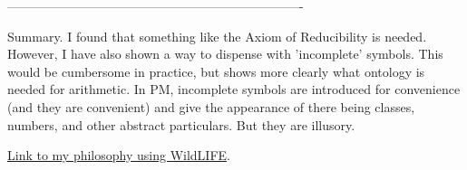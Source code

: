 \documentclass[12pt]{article}
\begin{document}
----------------------------------------------------------------------

Summary. I found that something like the Axiom of Reducibility is needed. However, I have also shown a way to dispense with 'incomplete' symbols. This would be cumbersome in practice, but shows more clearly what ontology is needed for arithmetic. In PM, incomplete symbols are introduced for convenience (and they are convenient) and give the appearance of there being classes, numbers, and other abstract particulars. But they are illusory.

\href{https://dennisdarland.com/darland_philosophy/HTML/darland_philosophy.html}{Link to my philosophy using WildLIFE}.
\end{document}
